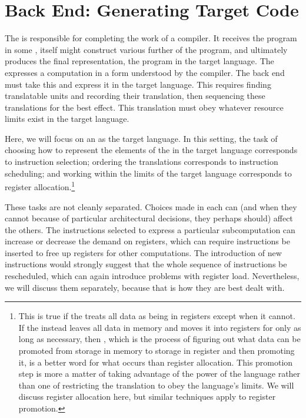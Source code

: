 \section{Back End: Generating Target Code}\label{background:compilers:back}
The  is responsible for completing the work of a compiler. It receives the program in some \IR{}, itself might construct various further \IRs of the program, and ultimately produces the final representation, the program in the target language. The \IR expresses a computation in a form understood by the compiler. The back end must take this and express it in the target language. This requires finding translatable units and recording their translation, then sequencing these translations for the best effect. This translation must obey whatever resource limits exist in the target language.

Here, we will focus on an \ISL as the target language. In this setting, the task of choosing how to represent the elements of the \IR in the target language corresponds to instruction selection; ordering the translations corresponds to instruction scheduling; and working within the limits of the target language corresponds to register allocation.\footnote{This is true if the \IR treats all data as being in registers except when it cannot. If the \IR instead leaves all data in memory and moves it into registers for only as long as necessary, then , which is the process of figuring out what data can be promoted from storage in memory to storage in register and then promoting it, is a better word for what occurs than register allocation. This promotion step is more a matter of taking advantage of the power of the language rather than one of restricting the translation to obey the language's limits. We will discuss register allocation here, but similar techniques apply to register promotion.}

These tasks are not cleanly separated. Choices made in each can (and when they cannot because of particular architectural decisions, they perhaps should) affect the others. The instructions selected to express a particular subcomputation can increase or decrease the demand on registers, which can require instructions be inserted to free up registers for other computations. The introduction of new instructions would strongly suggest that the whole sequence of instructions be rescheduled, which can again introduce problems with register load. Nevertheless, we will discuss them separately, because that is how they are best dealt with.


